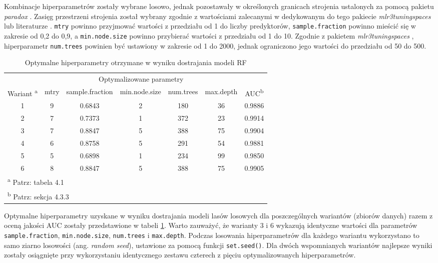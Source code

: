 \documentclass{amuthesis}
\begin{document}
Kombinacje hiperparametrów zostały wybrane losowo, jednak pozostawały w
określonych granicach strojenia ustalonych za pomocą pakietu
\emph{paradox} \autocite{R-paradox}. Zasięg przestrzeni strojenia został
wybrany zgodnie z wartościami zalecanymi w dedykowanym do tego pakiecie
\emph{mlr3tuningspaces} \autocite{R-mlr3tuningspaces} lub literaturze
\autocite{probst_2019_hyperparameters,schratz_2019_hyperparameters}.
\texttt{mtry} powinno przyjmować wartości z przedziału od 1 do liczby
predyktorów, \texttt{sample.fraction} powinno mieścić się w zakresie od
0,2 do 0,9, a \texttt{min.node.size} powinno przybierać wartości z
przedziału od 1 do 10. Zgodnie z pakietem \emph{mlr3tuningspaces}
\autocite{R-mlr3tuningspaces}, hiperparametr \texttt{num.trees} powinien
być ustawiony w zakresie od 1 do 2000, jednak ograniczono jego wartości
do przedziału od 50 do 500.

\hypertarget{tbl-tabela-tuning}{}
\begin{table}
\caption{\label{tbl-tabela-tuning}Optymalne hiperparametry otrzymane w wyniku dostrajania modeli RF }\tabularnewline

\centering
\begin{tabular}{ccccccc}
\toprule
\multicolumn{1}{c}{ } & \multicolumn{5}{c}{Optymalizowane parametry} & \multicolumn{1}{c}{ } \\
\cmidrule(l{3pt}r{3pt}){2-6}
Wariant \textsuperscript{a} & mtry & sample.fraction & min.node.size & num.trees & max.depth & AUC\textsuperscript{b}\\
\midrule
1 & 9 & 0.6843 & 2 & 180 & 36 & 0.9886\\
2 & 7 & 0.7373 & 1 & 372 & 23 & 0.9914\\
3 & 7 & 0.8847 & 5 & 388 & 75 & 0.9904\\
4 & 6 & 0.8758 & 5 & 291 & 54 & 0.9881\\
5 & 5 & 0.6898 & 1 & 234 & 99 & 0.9850\\
6 & 8 & 0.8847 & 5 & 388 & 75 & 0.9905\\
\bottomrule
\multicolumn{7}{l}{\textsuperscript{a} Patrz: tabela 4.1}\\
\multicolumn{7}{l}{\textsuperscript{b} Patrz: sekcja 4.3.3}\\
\end{tabular}
\end{table}

Optymalne hiperparametry uzyskane w wyniku dostrajania modeli lasów
losowych dla poszczególnych wariantów (zbiorów danych) razem z oceną
jakości AUC zostały przedstawione w tabeli \ref{tbl-tabela-tuning}.
Warto zauważyć, że warianty 3 i 6 wykazują identyczne wartości dla
parametrów \texttt{sample.fraction}, \texttt{min.node.size},
\texttt{num.trees} i \texttt{max.depth}. Podczas losowania
hiperparametrów dla każdego wariantu wykorzystano to samo ziarno
losowości (ang. \emph{random seed}), ustawione za pomocą funkcji
\texttt{set.seed()}. Dla dwóch wspomnianych wariantów najlepsze wyniki
zostały osiągnięte przy wykorzystaniu identycznego zestawu czterech z
pięciu optymalizowanych hiperparametrów.
\end{document}
